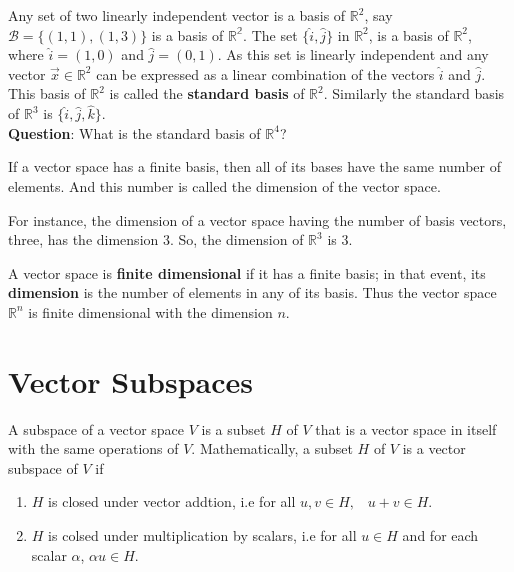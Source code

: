 \documentclass[aima104_lecturenotes_ku.tex]{subfiles}
\begin{document}
    \begin{example}
      Any set of two linearly independent vector is a basis of \(\mathbb{R}^2\), say \(\mathcal{B} = \{(1,1), (1,3)\}\) is a basis of \(\mathbb{R^2}\). The set $\{\hat{i}, \hat{j}\}$ in $\mathbb{R}^2$, is a basis of \(\mathbb{R}^2\), where \(\hat{i}=(1,0)\) and \(\hat{j}=(0,1)\). As this set is linearly independent and any vector $\vec{x} \in \mathbb{R}^2$ can be expressed as a linear combination of the vectors $\hat{i}$ and $\hat{j}$. This basis of \(\mathbb{R}^2\) is called the \textbf{standard basis} of \(\mathbb{R}^2\). Similarly the standard basis of \(\mathbb{R}^3\) is \(\{\hat{i}, \hat{j}, \hat{k}\}\). \\[2mm]
  \textbf{Question}: What is the standard basis of \(\mathbb{R}^4\)?
\end{example}

\begin{theorem}
    If a vector space has a finite basis, then all of its bases have the same number of elements. And this number is called the dimension of the vector space.
  \end{theorem}
 For instance, the dimension of a vector space having the number of basis vectors, three, has the dimension 3. So, the dimension of \(\mathbb{R}^{3}\) is 3.

\begin{definition}
    A vector space is \textbf{finite dimensional} if it has a finite basis; in that event, its \textbf{dimension} is the number of elements in any of its basis. Thus the vector space $\mathbb{R}^n$ is finite dimensional with the dimension $n$.
\end{definition}


\section{Vector Subspaces}
A subspace of a vector space $V$ is a subset $H$ of $V$ that is a vector space in itself with the same operations of $V$. Mathematically, a subset $H$ of $V$ is a vector subspace of $V$ if
\begin{enumerate}
\item $H$ is closed under vector addtion, i.e for all $u,v \in H, \;\;\;  u + v \in H$.

\item $H$ is colsed under multiplication by scalars, i.e for all $u \in H$ and for each scalar $\alpha$, $\alpha u \in H$.
\end{enumerate}
\end{document}
